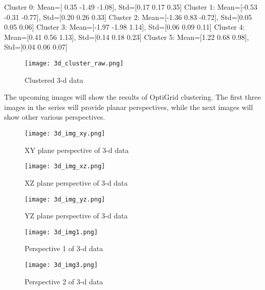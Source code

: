 \begin{tcolorbox}
    \small
Cluster 0: Mean=[ 0.35 -1.49 -1.08], Std=[0.17 0.17 0.35]\newline
Cluster 1: Mean=[-0.53 -0.31 -0.77], Std=[0.20 0.26 0.33]\newline
Cluster 2: Mean=[-1.36   0.83 -0.72], Std=[0.05 0.05 0.06]\newline
Cluster 3: Mean=[-1.97 -1.98  1.14], Std=[0.06 0.09 0.11]\newline
Cluster 4: Mean=[0.41 0.56 1.13], Std=[0.14 0.18 0.23]\newline
Cluster 5: Mean=[1.22 0.68 0.98], Std=[0.04 0.06 0.07]
\end{tcolorbox}
\normalfont

\begin{figure}[H]
    \centering
    \texttt{[image: 3d\_cluster\_raw.png]}
    \caption{Clustered 3-d data}
    \label{fig:3d_clustered}
\end{figure}

The upcoming images will show the results of OptiGrid clustering. The first three images in the series will provide planar perspectives, while the next images will show other various perspectives.

\begin{figure}[H]
    \centering
    \texttt{[image: 3d\_img\_xy.png]}
    \caption{XY plane perspective of 3-d data}
    \label{fig:3d_cluster_0}
\end{figure}

\begin{figure}[H]
    \centering
    \texttt{[image: 3d\_img\_xz.png]}
    \caption{XZ plane perspective of 3-d data}
    \label{fig:3d_cluster_1}
\end{figure}

\begin{figure}[H]
    \centering
    \texttt{[image: 3d\_img\_yz.png]}
    \caption{YZ plane perspective of 3-d data}
    \label{fig:3d_cluster_2}
\end{figure}

\begin{figure}[H]
    \centering
    \texttt{[image: 3d\_img1.png]}
    \caption{Perspective 1 of 3-d data}
    \label{fig:3d_cluster_3}
\end{figure}

\begin{figure}[H]
    \centering
    \texttt{[image: 3d\_img3.png]}
    \caption{Perspective 2 of 3-d data}
    \label{fig:3d_cluster_4}
\end{figure}

